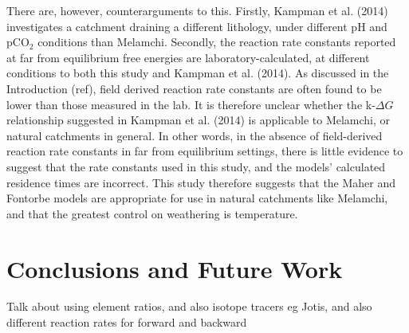 \bsk

There are, however, counterarguments to this. Firstly, Kampman et al. (2014) investigates a catchment draining a different lithology, under different pH and pCO$_2$ conditions than Melamchi. Secondly, the reaction rate constants reported at far from equilibrium free energies are laboratory-calculated, at different conditions to both this study and Kampman et al. (2014). As discussed in the Introduction (ref), field derived reaction rate constants are often found to be lower than those measured in the lab. It is therefore unclear whether the k-$\Delta G$ relationship suggested in Kampman et al. (2014) is applicable to Melamchi, or natural catchments in general. In other words, in the absence of field-derived reaction rate constants in far from equilibrium settings, there is little evidence to suggest that the rate constants used in this study, and the models' calculated residence times are incorrect. This study therefore suggests that the Maher and Fontorbe models are appropriate for use in natural catchments like Melamchi, and that the greatest control on weathering is temperature.




\newpage

\section{Conclusions and Future Work}

Talk about using element ratios, and also isotope tracers eg Jotis, and also different reaction rates for forward and backward








